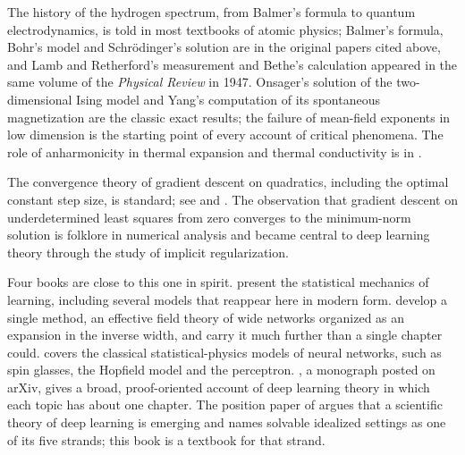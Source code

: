 \begin{refsection}
\notesandrefs

The history of the hydrogen spectrum, from Balmer's formula to quantum electrodynamics, is told in most textbooks of atomic physics; Balmer's formula, Bohr's model and Schr\"odinger's solution are in the original papers cited above, and Lamb and Retherford's measurement and Bethe's calculation appeared in the same volume of the \emph{Physical Review} in 1947. Onsager's solution of the two-dimensional Ising model \parencite{Onsager1944} and Yang's computation of its spontaneous magnetization \parencite{Yang1952} are the classic exact results; the failure of mean-field exponents in low dimension is the starting point of every account of critical phenomena. The role of anharmonicity in thermal expansion and thermal conductivity is in \textcite{AshcroftMermin1976}.

The convergence theory of gradient descent on quadratics, including the optimal constant step size, is standard; see \textcite{Polyak1987} and \textcite{Nesterov2018}. The observation that gradient descent on underdetermined least squares from zero converges to the minimum-norm solution is folklore in numerical analysis and became central to deep learning theory through the study of implicit regularization.

Four books are close to this one in spirit. \Textcite{EngelVandenBroeck2001} present the statistical mechanics of learning, including several models that reappear here in modern form. \Textcite{RobertsYaidaHanin2022} develop a single method, an effective field theory of wide networks organized as an expansion in the inverse width, and carry it much further than a single chapter could. \Textcite{Huang2021} covers the classical statistical-physics models of neural networks, such as spin glasses, the Hopfield model and the perceptron. \Textcite{Zhao2026}, a monograph posted on arXiv, gives a broad, proof-oriented account of deep learning theory in which each topic has about one chapter. The position paper of \textcite{SimonEtAl2026} argues that a scientific theory of deep learning is emerging and names solvable idealized settings as one of its five strands; this book is a textbook for that strand.

\printchapterbib
\end{refsection}

